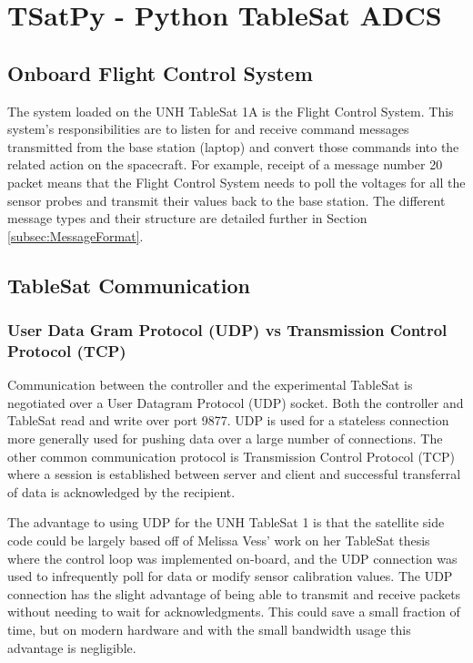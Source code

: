 
\chapter{TSatPy - Python TableSat ADCS}
\label{chap:TSatPy}

\section{Onboard Flight Control System}
\label{sec:OnbaoardFlightSystem}

The system loaded on the UNH TableSat 1A is the Flight Control System.  This system's responsibilities are to listen for and receive command messages transmitted from the base station (laptop) and convert those commands into the related action on the spacecraft.  For example, receipt of a message number 20 packet means that the Flight Control System needs to poll the voltages for all the sensor probes and transmit their values back to the base station.  The different message types and their structure are detailed further in Section \ref{subsec:MessageFormat}.

\section{TableSat Communication}
\label{sec:TableSatCommunication}

\subsection{User Data Gram Protocol (UDP) vs Transmission Control Protocol (TCP)}
\label{subsec:UDPTCP}

Communication between the controller and the experimental TableSat is
negotiated over a User Datagram Protocol (UDP) socket.  Both the
controller and TableSat read and write over port 9877.  UDP is used for
a stateless connection more generally used for pushing data over a
large number of connections.  The other common communication protocol
is Transmission Control Protocol (TCP) where a session is established
between server and client and successful transferral of data is
acknowledged by the recipient.

The advantage to using UDP for the UNH TableSat 1 is that the satellite
side code could be largely based off of Melissa Vess' work on her
TableSat thesis where the control loop was implemented on-board, and
the UDP connection was used to infrequently poll for data or modify
sensor calibration values.  The UDP connection has the slight advantage
of being able to transmit and receive packets without needing to wait for
acknowledgments.  This could save a small fraction of time, but on modern
hardware and with the small bandwidth usage this advantage is negligible.

